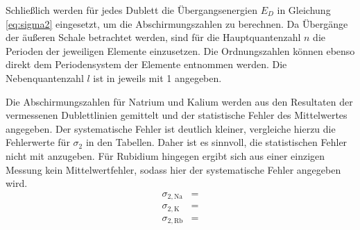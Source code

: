Schließlich werden für jedes Dublett die Übergangsenergien $E_D$ in Gleichung \eqref{eq:sigma2} eingesetzt, um die Abschirmungszahlen zu berechnen. Da Übergänge der äußeren Schale betrachtet werden, sind für die Hauptquantenzahl $n$ die Perioden der jeweiligen Elemente einzusetzen. Die Ordnungszahlen können ebenso direkt dem Periodensystem der Elemente entnommen werden. Die Nebenquantenzahl $l$ ist in \cite{skript} jeweils mit 1 angegeben.



Die Abschirmungszahlen für Natrium und Kalium werden aus den Resultaten der vermessenen Dublettlinien gemittelt und der statistische Fehler des Mittelwertes angegeben. Der systematische Fehler ist deutlich kleiner, vergleiche hierzu die Fehlerwerte für $\sigma_2$ in den Tabellen. Daher ist es sinnvoll, die statistischen Fehler nicht mit anzugeben. Für Rubidium hingegen ergibt sich aus einer einzigen Messung kein Mittelwertfehler, sodass hier der systematische Fehler angegeben wird.
\begin{align*}
  \sigma_{2,\text{Na}} &=   \\
  \sigma_{2,\text{K}} &=     \\
  \sigma_{2,\text{Rb}} &=  \\
\end{align*}
%
%
